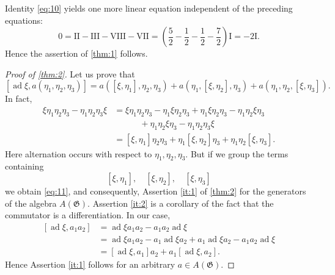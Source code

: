 \documentclass[a4paper]{article}
\newcommand{\ad}{\operatorname{ad}}
\begin{document}
\medskip

Identity \eqref{eq:10} yields one more linear equation independent of the preceding equations:
\begin{equation*}
	0 = \textrm{II} - \textrm{III} - \textrm{VIII} - \textrm{VII} = \left(\frac 52 - \frac 12 - \frac 12 - \frac 72\right) \textrm{I} = - 2 \textrm{I}.
\end{equation*}
Hence the assertion of \cref{thm:1} follows.

\begin{proof}[Proof of \cref{thm:2}]
	Let us prove that
	\begin{equation} 
		\label{eq:11}
		\left[\ad \xi, a\left(\eta_1, \eta_2, \eta_3\right)\right]=a\left(\left[\xi, \eta_1\right], \eta_2, \eta_3\right)+a\left(\eta_1,\left[\xi, \eta_2\right], \eta_3\right)+a\left(\eta_1, \eta_2,\left[\xi, \eta_3\right]\right).
	\end{equation}
	In fact,
	\begin{equation*}
		\begin{split}
			\xi \eta_1 \eta_2 \eta_3-\eta_1 \eta_2 \eta_3 \xi & =\xi \eta_1 \eta_2 \eta_3-\eta_1 \xi \eta_2 \eta_3+\eta_1 \xi \eta_2 \eta_3-\eta_1 \eta_2 \xi \eta_3
			\\
			& \quad \quad \quad +\eta_1 \eta_2 \xi \eta_3-\eta_1 \eta_2 \eta_3 \xi \\
			& =\left[\xi, \eta_1\right] \eta_2 \eta_3+\eta_1\left[\xi, \eta_2\right] \eta_3+\eta_1 \eta_2\left[\xi, \eta_3\right] .
		\end{split}
	\end{equation*}
	Here alternation occurs with respect to $\eta_1, \eta_2, \eta_3$. But if we group the terms containing
	\begin{equation*}
		\left[\xi, \eta_1\right], \quad\left[\xi, \eta_2\right], \quad\left[\xi, \eta_3\right]
	\end{equation*}
	we obtain \eqref{eq:11}, and consequently, Assertion \ref{it:1} of \cref{thm:2} for the generators of the algebra $A(\mathfrak{G})$.
	Assertion \ref{it:2} is a corollary of the fact that the commutator is a differentiation. 
	In our case,
	\begin{equation*}
		\begin{split}
			{\left[\ad \xi, a_1 a_2\right] } & =\ad \xi a_1 a_2-a_1 a_2 \ad \xi \\
			& =\ad \xi a_1 a_2-a_1 \ad \xi a_2+a_1 \ad \xi a_2-a_1 a_2 \ad \xi \\
			& =\left[\ad \xi, a_1\right] a_2+a_1\left[\ad \xi, a_2\right] .
		\end{split}
	\end{equation*}
	Hence Assertion \ref{it:1} follows for an arbitrary $a \in A(\mathfrak{G})$.
\end{proof}
\end{document}
